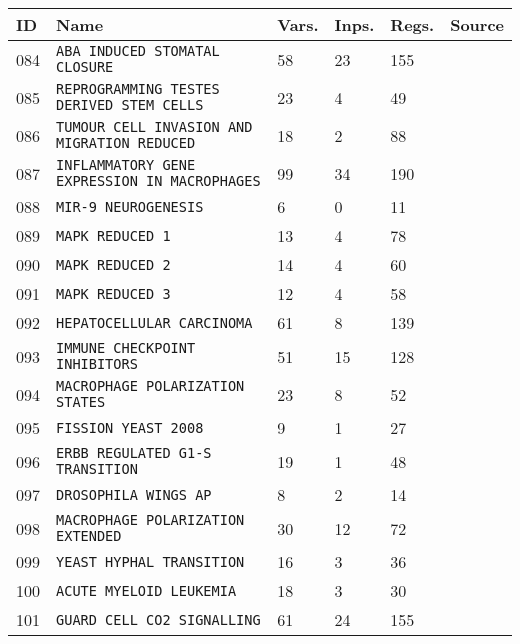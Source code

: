 \documentclass{article}
\begin{document}
\begin{center}
	\begin{tabular}{ | C{16pt} | C{149pt} | C{25pt} | C{25pt} | C{25pt} | C{36pt} | }
		\hline
		ID & Name & Vars. & Inps. & Regs. & Source \\ 
		 & \texttt{ABA INDUCED STOMATAL CLOSURE} & 58 & 23 & 155 & \cite{bbm-084} \\
		 & \texttt{REPROGRAMMING TESTES DERIVED STEM CELLS} & 23 & 4 & 49 & \cite{bbm-085} \\
		 & \texttt{TUMOUR CELL INVASION AND MIGRATION REDUCED} & 18 & 2 & 88 & \cite{bbm-065-086, ginsim} \\
		 & \texttt{INFLAMMATORY GENE EXPRESSION IN MACROPHAGES} & 99 & 34 & 190 & \cite{bbm-087} \\
		 & \texttt{MIR-9 NEUROGENESIS} & 6 & 0 & 11 & \cite{bbm-088, ginsim} \\
		 & \texttt{MAPK REDUCED 1} & 13 & 4 & 78 & \cite{bbm-070-089-090-091, ginsim} \\
		 & \texttt{MAPK REDUCED 2} & 14 & 4 & 60 & \cite{bbm-070-089-090-091, ginsim} \\
		 & \texttt{MAPK REDUCED 3} & 12 & 4 & 58 & \cite{bbm-070-089-090-091, ginsim} \\
		 & \texttt{HEPATOCELLULAR CARCINOMA} & 61 & 8 & 139 & \cite{bbm-092-174} \\
		 & \texttt{IMMUNE CHECKPOINT INHIBITORS} & 51 & 15 & 128 & \cite{bbm-093, ginsim} \\
		 & \texttt{MACROPHAGE POLARIZATION STATES} & 23 & 8 & 52 & \cite{bbm-094} \\
		 & \texttt{FISSION YEAST 2008} & 9 & 1 & 27 & \cite{bbm-095, ginsim} \\
		 & \texttt{ERBB REGULATED G1-S TRANSITION} & 19 & 1 & 48 & \cite{bbm-096, ginsim} \\
		 & \texttt{DROSOPHILA WINGS AP} & 8 & 2 & 14 & \cite{bbm-097, ginsim} \\
		 & \texttt{MACROPHAGE POLARIZATION EXTENDED} & 30 & 12 & 72 & \cite{bbm-098} \\
		 & \texttt{YEAST HYPHAL TRANSITION} & 16 & 3 & 36 & \cite{bbm-099} \\
		 & \texttt{ACUTE MYELOID LEUKEMIA} & 18 & 3 & 30 & \cite{bbm-100} \\
		 & \texttt{GUARD CELL CO2 SIGNALLING} & 61 & 24 & 155 & \cite{bbm-101} \\

\end{tabular}
\end{center}
\end{document}
